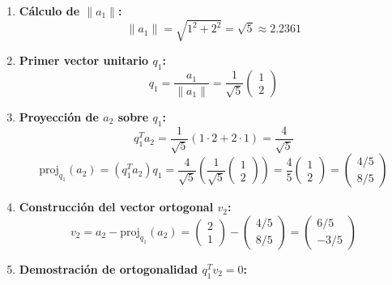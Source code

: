 \documentclass[11pt,a4paper]{article}
\theoremstyle{definition}
\theoremstyle{remark}
\begin{document}
\begin{enumerate}[leftmargin=*]
    \item \textbf{Cálculo de $\|a_1\|$:}
    \begin{equation}
        \|a_1\| = \sqrt{1^2 + 2^2} = \sqrt{5} \approx 2.2361
    \end{equation}
    \item \textbf{Primer vector unitario $q_1$:}
    \begin{equation}
        q_1 = \frac{a_1}{\|a_1\|} = \frac{1}{\sqrt{5}} \begin{pmatrix} 1 \\ 2 \end{pmatrix}
    \end{equation}
    \item \textbf{Proyección de $a_2$ sobre $q_1$:}
    \begin{equation}
        q_1^T a_2 = \frac{1}{\sqrt{5}} (1\cdot 2 + 2\cdot 1) = \frac{4}{\sqrt{5}}
    \end{equation}
    \begin{equation}
        \text{proj}_{q_1}(a_2) = (q_1^T a_2) q_1 = \frac{4}{\sqrt{5}} \left( \frac{1}{\sqrt{5}} \begin{pmatrix} 1 \\ 2 \end{pmatrix} \right) = \frac{4}{5} \begin{pmatrix} 1 \\ 2 \end{pmatrix} = \begin{pmatrix} 4/5 \\ 8/5 \end{pmatrix}
    \end{equation}
    \item \textbf{Construcción del vector ortogonal $v_2$:}
    \begin{equation}
        v_2 = a_2 - \text{proj}_{q_1}(a_2) = \begin{pmatrix} 2 \\ 1 \end{pmatrix} - \begin{pmatrix} 4/5 \\ 8/5 \end{pmatrix} = \begin{pmatrix} 6/5 \\ -3/5 \end{pmatrix}
    \end{equation}
    \item \textbf{Demostración de ortogonalidad $q_1^T v_2 = 0$:}

\end{enumerate}
\end{document}
